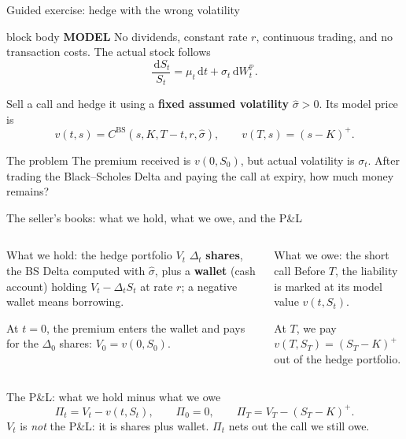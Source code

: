 \documentclass[handout,10pt,aspectratio=169]{beamer}
\newenvironment{modelbox}{\begin{beamercolorbox}[rounded=true,sep=0.7em,wd=\textwidth]{block body}
  \textbf{\color{CourseBlue}MODEL}\quad}{\end{beamercolorbox}}
\newcommand{\dd}{\,\mathrm d}
\newcommand{\Pp}{\mathbb P}
\newcommand{\1}{\mathbf 1}
\begin{document}
\begin{frame}{Guided exercise: hedge with the wrong volatility}
\begin{modelbox}
No dividends, constant rate \(r\), continuous trading, and no transaction costs.
The actual stock follows
\[
\frac{\dd S_t}{S_t}=\mu_t\dd t+\sigma_t\dd W_t^{\Pp}.
\]
\end{modelbox}
Sell a call and hedge it using a \textbf{fixed assumed volatility}
\(\widehat\sigma>0\). Its model price is
\[
v(t,s)=C^{\mathrm{BS}}(s,K,T-t,r,\widehat\sigma),
\qquad v(T,s)=(s-K)^+.
\]
\begin{block}{The problem}
The premium received is \(v(0,S_0)\), but actual volatility is \(\sigma_t\).
After trading the Black--Scholes Delta and paying the call at expiry,
how much money remains?
\end{block}
\end{frame}

\begin{frame}{The seller's books: what we hold, what we owe, and the P\&L}
\begin{columns}[T,onlytextwidth]
\begin{block}{What we hold: the hedge portfolio \(V_t\)}
\(\Delta_t\) \textbf{shares}, the BS Delta computed with \(\widehat\sigma\),
plus a \textbf{wallet} (cash account) holding \(V_t-\Delta_tS_t\) at rate \(r\);
a negative wallet means borrowing.
\smallskip

At \(t=0\), the premium enters the wallet and pays for the \(\Delta_0\) shares:
\(V_0=v(0,S_0)\).
\end{block}
\begin{alertblock}{What we owe: the short call}
Before \(T\), the liability is marked at its model value \(v(t,S_t)\).
\smallskip

At \(T\), we pay \(v(T,S_T)=(S_T-K)^+\) out of the hedge portfolio.
\end{alertblock}
\end{columns}
\medskip
\begin{exampleblock}{The P\&L: what we hold minus what we owe}
\[
\boxed{\Pi_t=V_t-v(t,S_t),}\qquad
\Pi_0=0,\qquad
\Pi_T=V_T-(S_T-K)^+.
\]
\(V_t\) is \emph{not} the P\&L: it is shares plus wallet.
\(\Pi_t\) nets out the call we still owe.
\end{exampleblock}
\end{frame}
\end{document}
